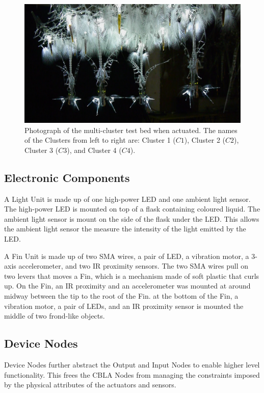 \begin{figure} [!htb]
	\centering
	\includegraphics[width=1.0\textwidth]{"fig/validations/cbla-test-bed photo 2"}
	\caption[Photograph of the multi-cluster test bed]{Photograph of the multi-cluster test bed when actuated. The names of the Clusters from left to right are: Cluster 1 ($C1$), Cluster 2 ($C2$), Cluster 3 ($C3$), and Cluster 4 ($C4$).}
	\label{fig:cbla-test-bed photo 2}
\end{figure}


\subsection{Electronic Components}

A Light Unit is made up of one high-power LED and one ambient light sensor. The high-power LED is mounted on top of a flask containing coloured liquid. The ambient light sensor is mount on the side of the flask under the LED. This allows the ambient light sensor the measure the intensity of the light emitted by the LED. 

A Fin Unit is made up of two SMA wires, a pair of LED, a vibration motor, a 3-axis accelerometer, and two IR proximity sensors. The two SMA wires pull on two levers that moves a Fin, which is a mechanism made of soft plastic that curls up. On the Fin, an IR proximity and an accelerometer was mounted at around midway between the tip to the root of the Fin. at the bottom of the Fin, a vibration motor, a pair of LEDs, and an IR proximity sensor is mounted the middle of two frond-like objects. 

\subsection{Device Nodes}

Device Nodes further abstract the Output and Input Nodes to enable higher level functionality. This frees the CBLA Nodes from managing the constraints imposed by the physical attributes of the actuators and sensors. 

